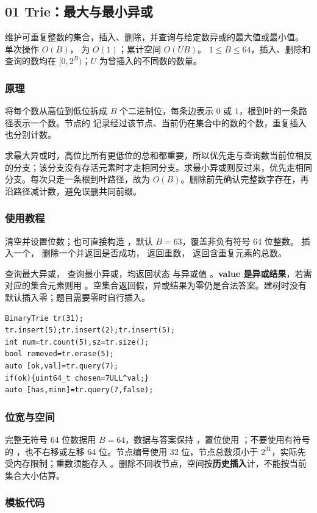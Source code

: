 \subsection{01 Trie：最大与最小异或}
\label{algo:binary-trie}
\AlgorithmInfo
    {维护可重复整数的集合，插入、删除，并查询与给定数异或的最大值或最小值。}
    {单次操作 $O(B)$， 为 $O(1)$；累计空间 $O(UB)$。}
    {$1\leq B\leq64$，插入、删除和查询的数均在 $[0,2^B)$；$U$ 为曾插入的不同数的数量。}

\subsubsection*{原理}
将每个数从高位到低位拆成 $B$ 个二进制位，每条边表示 $0$ 或 $1$，根到叶的一条路径表示一个数。节点的  记录经过该节点、当前仍在集合中的数的个数，重复插入也分别计数。

求最大异或时，高位比所有更低位的总和都重要，所以优先走与查询数当前位相反的分支；该分支没有存活元素时才走相同分支。求最小异或则反过来，优先走相同分支。每次只走一条根到叶路径，故为 $O(B)$。删除前先确认完整数字存在，再沿路径减计数，避免误删共同前缀。

\subsubsection*{使用教程}
 清空并设置位数；也可直接构造 ，默认 $B=63$，覆盖非负有符号 64 位整数。 插入一个， 删除一个并返回是否成功， 返回重数， 返回含重复元素的总数。

 查询最大异或， 查询最小异或，均返回状态  与异或值 。\textbf{value 是异或结果}，若需对应的集合元素则用 。空集合返回假，异或结果为零仍是合法答案。建树时没有默认插入零；题目需要零时自行插入。
\begin{lstlisting}[style=mtycpp,numbers=none]
BinaryTrie tr(31);
tr.insert(5);tr.insert(2);tr.insert(5);
int num=tr.count(5),sz=tr.size();
bool removed=tr.erase(5);
auto [ok,val]=tr.query(7);
if(ok){uint64_t chosen=7ULL^val;}
auto [has,minn]=tr.query(7,false);
\end{lstlisting}

\subsubsection*{位宽与空间}
完整无符号 64 位数据用 $B=64$，数据与答案保持 ，置位使用 ；不要使用有符号的 ，也不右移或左移 64 位。节点编号使用 32 位，节点总数须小于 $2^{31}$，实际先受内存限制；重数须能存入 。删除不回收节点，空间按\textbf{历史插入}计，不能按当前集合大小估算。

\subsubsection*{模板代码}
